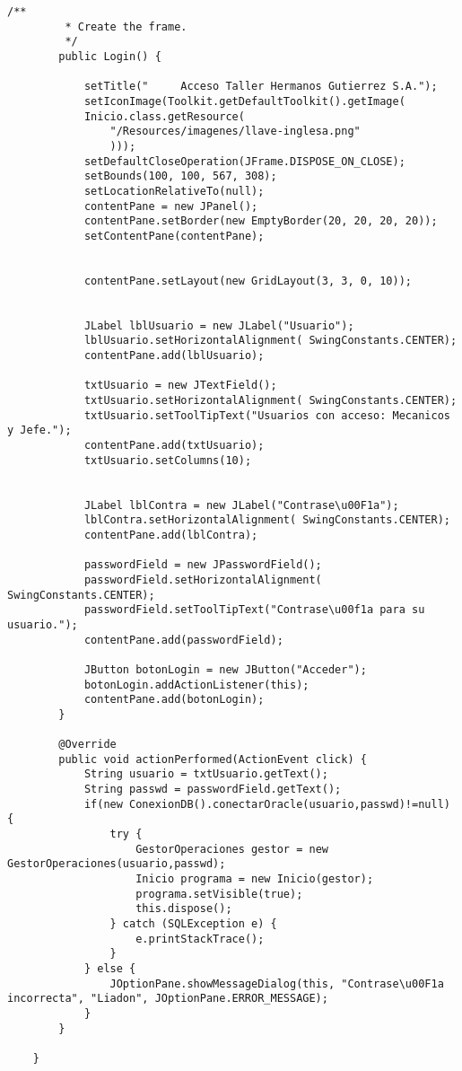 \begin{lstlisting}[caption=Login.java (App Escritorio)]
        /**
         * Create the frame.
         */
        public Login() {
            
            setTitle("     Acceso Taller Hermanos Gutierrez S.A.");
            setIconImage(Toolkit.getDefaultToolkit().getImage(
            Inicio.class.getResource( 
                "/Resources/imagenes/llave-inglesa.png" 
                )));
            setDefaultCloseOperation(JFrame.DISPOSE_ON_CLOSE);
            setBounds(100, 100, 567, 308);
            setLocationRelativeTo(null);
            contentPane = new JPanel();
            contentPane.setBorder(new EmptyBorder(20, 20, 20, 20));
            setContentPane(contentPane);
            
        
            contentPane.setLayout(new GridLayout(3, 3, 0, 10));
            
            
            JLabel lblUsuario = new JLabel("Usuario");
            lblUsuario.setHorizontalAlignment( SwingConstants.CENTER);
            contentPane.add(lblUsuario);
            
            txtUsuario = new JTextField();
            txtUsuario.setHorizontalAlignment( SwingConstants.CENTER);
            txtUsuario.setToolTipText("Usuarios con acceso: Mecanicos y Jefe.");
            contentPane.add(txtUsuario);
            txtUsuario.setColumns(10);
            
        
            JLabel lblContra = new JLabel("Contrase\u00F1a");
            lblContra.setHorizontalAlignment( SwingConstants.CENTER);
            contentPane.add(lblContra);
            
            passwordField = new JPasswordField();
            passwordField.setHorizontalAlignment( SwingConstants.CENTER);
            passwordField.setToolTipText("Contrase\u00f1a para su usuario.");
            contentPane.add(passwordField);
            
            JButton botonLogin = new JButton("Acceder");
            botonLogin.addActionListener(this);
            contentPane.add(botonLogin);
        }
        
        @Override
        public void actionPerformed(ActionEvent click) {
            String usuario = txtUsuario.getText();
            String passwd = passwordField.getText();
            if(new ConexionDB().conectarOracle(usuario,passwd)!=null) {
                try {
                    GestorOperaciones gestor = new GestorOperaciones(usuario,passwd);
                    Inicio programa = new Inicio(gestor);
                    programa.setVisible(true);
                    this.dispose();
                } catch (SQLException e) {
                    e.printStackTrace();
                }
            } else {
                JOptionPane.showMessageDialog(this, "Contrase\u00F1a incorrecta", "Liadon", JOptionPane.ERROR_MESSAGE);
            } 
        }
    
    }
\end{lstlisting}
\clearpage

